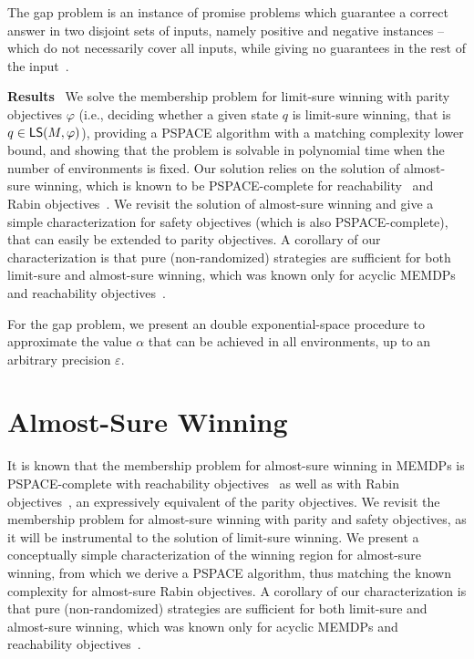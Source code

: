 \documentclass[a4paper,USenglish,cleveref, autoref, thm-restate]{lipics-v2021}
\let\epsilon\varepsilon
\def\myparagraph#1{\noindent\textbf{#1}~}
\newcommand\limitsure{\textrm{\sf LS}}
\begin{document}
The gap problem is an instance of promise problems
which  guarantee a correct answer in two disjoint sets of
inputs, namely positive and negative instances -- which do not necessarily cover all
inputs, while giving no guarantees in the rest
of the input~\cite{ESY-ic84,goldreich2005promise}.

\smallskip
\myparagraph{Results}
We solve the membership problem for limit-sure winning with parity objectives $\varphi$ (i.e.,
deciding whether a given state $q$ is limit-sure winning, that is $q \in \limitsure(M, \varphi)$),
providing a PSPACE algorithm with a matching complexity lower bound, and showing that the problem is solvable in polynomial time when 
the number of environments is fixed.
Our solution relies on the solution of almost-sure winning, 
which is known to be PSPACE-complete for reachability~\cite{vdVJJ23} and Rabin objectives~\cite{SVJ24}. 
We revisit the solution of almost-sure winning and give a simple 
characterization for safety objectives (which is also PSPACE-complete),
that can easily be extended to parity objectives.
A corollary of our characterization is that pure (non-randomized) strategies are sufficient for both limit-sure
and almost-sure winning, which was known only for acyclic MEMDPs and reachability
objectives~\cite[Lemma~12]{vdVJJ23}.

For the gap problem, we present an double exponential-space procedure 
to approximate the value $\alpha$ that can be achieved in all environments,
up to an arbitrary precision $\epsilon$.


\section{Almost-Sure Winning}\label{section:as}
It is known that the membership problem for almost-sure winning in MEMDPs is PSPACE-complete 
with reachability objectives~\cite{vdVJJ23} as well as with Rabin objectives~\cite{SVJ24}, an
expressively equivalent of the parity objectives.
We revisit the membership problem for almost-sure winning with parity and safety objectives,
as it will be instrumental to the solution of limit-sure winning.
We present a conceptually simple characterization of the winning region
for almost-sure winning, from which we derive a PSPACE algorithm, thus 
matching the known complexity for almost-sure Rabin objectives.
A corollary of our characterization is that pure (non-randomized) strategies 
are sufficient for both limit-sure and almost-sure winning, which was known 
only for acyclic MEMDPs and reachability objectives~\cite[Lemma~12]{vdVJJ23}. 
\end{document}
